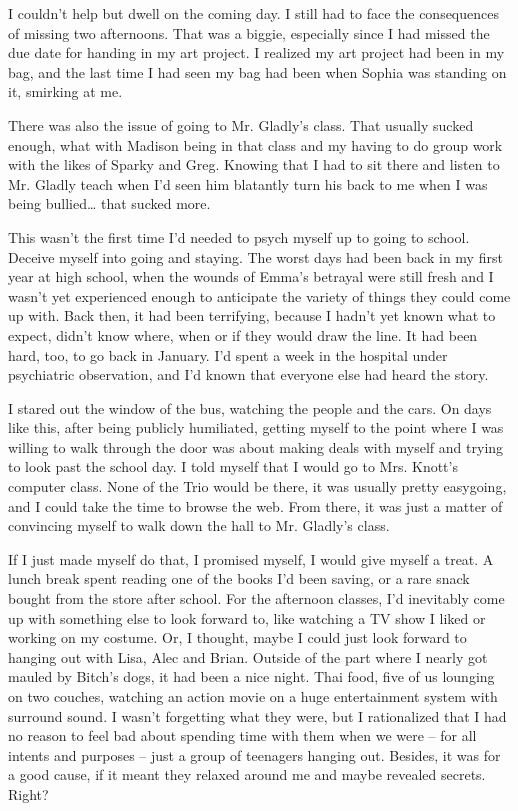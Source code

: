 I couldn't help but dwell on the coming day. I still had to face the consequences of missing two afternoons. That was a biggie, especially since I had missed the due date for handing in my art project. I realized my art project had been in my bag, and the last time I had seen my bag had been when Sophia was standing on it, smirking at me.

There was also the issue of going to Mr. Gladly's class. That usually sucked enough, what with Madison being in that class and my having to do group work with the likes of Sparky and Greg. Knowing that I had to sit there and listen to Mr. Gladly teach when I'd seen him blatantly turn his back to me when I was being bullied\ldots{} that sucked more.

This wasn't the first time I'd needed to psych myself up to going to school. Deceive myself into going and staying. The worst days had been back in my first year at high school, when the wounds of Emma's betrayal were still fresh and I wasn't yet experienced enough to anticipate the variety of things they could come up with. Back then, it had been terrifying, because I hadn't yet known what to expect, didn't know where, when or if they would draw the line. It had been hard, too, to go back in January. I'd spent a week in the hospital under psychiatric observation, and I'd known that everyone else had heard the story.

I stared out the window of the bus, watching the people and the cars. On days like this, after being publicly humiliated, getting myself to the point where I was willing to walk through the door was about making deals with myself and trying to look past the school day. I told myself that I would go to Mrs. Knott's computer class. None of the Trio would be there, it was usually pretty easygoing, and I could take the time to browse the web. From there, it was just a matter of convincing myself to walk down the hall to Mr. Gladly's class.

If I just made myself do that, I promised myself, I would give myself a treat. A lunch break spent reading one of the books I'd been saving, or a rare snack bought from the store after school. For the afternoon classes, I'd inevitably come up with something else to look forward to, like watching a TV show I liked or working on my costume. Or, I thought, maybe I could just look forward to hanging out with Lisa, Alec and Brian. Outside of the part where I nearly got mauled by Bitch's dogs, it had been a nice night. Thai food, five of us lounging on two couches, watching an action movie on a huge entertainment system with surround sound. I wasn't forgetting what they were, but I rationalized that I had no reason to feel bad about spending time with them when we were -- for all intents and purposes -- just a group of teenagers hanging out. Besides, it was for a good cause, if it meant they relaxed around me and maybe revealed secrets. Right?

